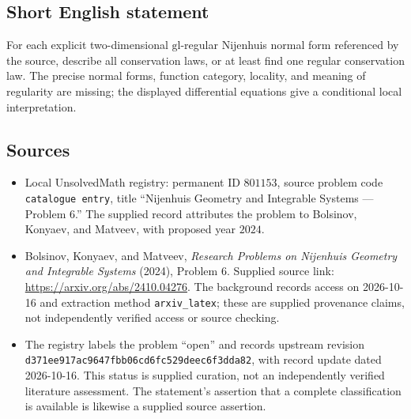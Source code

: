 \documentclass[11pt]{article}
\begin{document}
\subsection{Short English statement}
For each explicit two-dimensional $\mathrm{gl}$-regular Nijenhuis normal form referenced by the source, describe all conservation laws, or at least find one regular conservation law. The precise normal forms, function category, locality, and meaning of regularity are missing; the displayed differential equations give a conditional local interpretation.
\subsection{Sources}
\begin{itemize}
\item Local UnsolvedMath registry: permanent ID $801153$, source problem code \texttt{catalogue entry}, title ``Nijenhuis Geometry and Integrable Systems --- Problem 6.'' The supplied record attributes the problem to Bolsinov, Konyaev, and Matveev, with proposed year $2024$.
\item Bolsinov, Konyaev, and Matveev, \emph{Research Problems on Nijenhuis Geometry and Integrable Systems} (2024), Problem 6. Supplied source link: \url{https://arxiv.org/abs/2410.04276}. The background records access on 2026-10-16 and extraction method \texttt{arxiv\_latex}; these are supplied provenance claims, not independently verified access or source checking.
\item The registry labels the problem ``open'' and records upstream revision \texttt{d371ee917ac9647fbb06cd6fc529deec6f3dda82}, with record update dated 2026-10-16. This status is supplied curation, not an independently verified literature assessment. The statement's assertion that a complete classification is available is likewise a supplied source assertion.
\end{itemize}
\end{document}
